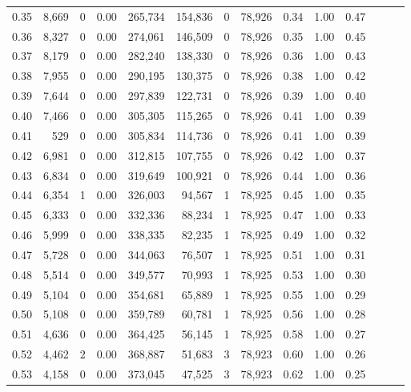 \begin{tabular}{rrrrrrrrrrrrrr}
0.35 &  8,669 &      0 &  0.00 &  265,734 &  154,836 &       0 &  78,926 &  0.34 &  1.00 &      0.47 \\
0.36 &  8,327 &      0 &  0.00 &  274,061 &  146,509 &       0 &  78,926 &  0.35 &  1.00 &      0.45 \\
0.37 &  8,179 &      0 &  0.00 &  282,240 &  138,330 &       0 &  78,926 &  0.36 &  1.00 &      0.43 \\
0.38 &  7,955 &      0 &  0.00 &  290,195 &  130,375 &       0 &  78,926 &  0.38 &  1.00 &      0.42 \\
0.39 &  7,644 &      0 &  0.00 &  297,839 &  122,731 &       0 &  78,926 &  0.39 &  1.00 &      0.40 \\
0.40 &  7,466 &      0 &  0.00 &  305,305 &  115,265 &       0 &  78,926 &  0.41 &  1.00 &      0.39 \\
0.41 &    529 &      0 &  0.00 &  305,834 &  114,736 &       0 &  78,926 &  0.41 &  1.00 &      0.39 \\
0.42 &  6,981 &      0 &  0.00 &  312,815 &  107,755 &       0 &  78,926 &  0.42 &  1.00 &      0.37 \\
0.43 &  6,834 &      0 &  0.00 &  319,649 &  100,921 &       0 &  78,926 &  0.44 &  1.00 &      0.36 \\
0.44 &  6,354 &      1 &  0.00 &  326,003 &   94,567 &       1 &  78,925 &  0.45 &  1.00 &      0.35 \\
0.45 &  6,333 &      0 &  0.00 &  332,336 &   88,234 &       1 &  78,925 &  0.47 &  1.00 &      0.33 \\
0.46 &  5,999 &      0 &  0.00 &  338,335 &   82,235 &       1 &  78,925 &  0.49 &  1.00 &      0.32 \\
0.47 &  5,728 &      0 &  0.00 &  344,063 &   76,507 &       1 &  78,925 &  0.51 &  1.00 &      0.31 \\
0.48 &  5,514 &      0 &  0.00 &  349,577 &   70,993 &       1 &  78,925 &  0.53 &  1.00 &      0.30 \\
0.49 &  5,104 &      0 &  0.00 &  354,681 &   65,889 &       1 &  78,925 &  0.55 &  1.00 &      0.29 \\
0.50 &  5,108 &      0 &  0.00 &  359,789 &   60,781 &       1 &  78,925 &  0.56 &  1.00 &      0.28 \\
0.51 &  4,636 &      0 &  0.00 &  364,425 &   56,145 &       1 &  78,925 &  0.58 &  1.00 &      0.27 \\
0.52 &  4,462 &      2 &  0.00 &  368,887 &   51,683 &       3 &  78,923 &  0.60 &  1.00 &      0.26 \\
0.53 &  4,158 &      0 &  0.00 &  373,045 &   47,525 &       3 &  78,923 &  0.62 &  1.00 &      0.25 \\

\end{tabular}
